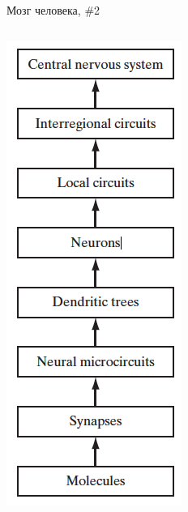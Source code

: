 \documentclass[10pt]{beamer}
\begin{document}
\begin{frame}{Мозг человека, \#2}

\begin{columns}
    \includegraphics[width=1\textwidth]{images/bd_brain.png}

\end{columns}
\end{frame}
\end{document}
